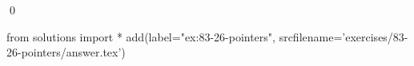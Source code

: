 
\begin{ex}
  \label{ex:83-26-pointers}
  
  \qed
\end{ex}
\begin{python0}
from solutions import *
add(label="ex:83-26-pointers",
    srcfilename='exercises/83-26-pointers/answer.tex')
\end{python0}
